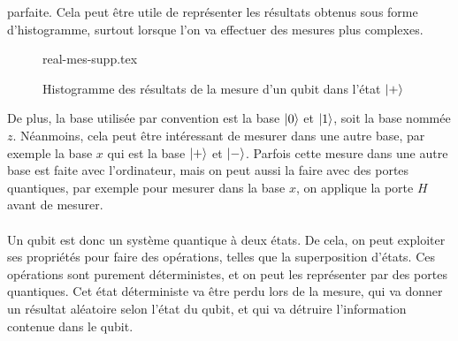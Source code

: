 parfaite.
Cela peut être utile de représenter les résultats obtenus sous forme d'histogramme, surtout lorsque l'on va
effectuer des mesures plus complexes.
\begin{figure}[H]
    \centering
    {real-mes-supp.tex}
    \caption[Histogramme des résultats de la mesure d'un qubit dans l'état $\ket{+}$]{Histogramme des résultats de la mesure d'un qubit dans l'état $\ket{+}$ \protect\footnotemark}
    \label{fig:measure}
\end{figure}
De plus, la base utilisée par convention est la base $\ket{0}$ et $\ket{1}$, soit la base nommée $z$.
Néanmoins, cela peut être intéressant de mesurer dans une autre base, par exemple la base $x$ qui est la base
$\ket{+}$ et $\ket{-}$.
Parfois cette mesure dans une autre base est faite avec l'ordinateur, mais on peut aussi la faire avec des
portes quantiques, par exemple pour mesurer dans la base $x$, on applique la porte $H$ avant de mesurer.\\ \\
Un qubit est donc un système quantique à deux états.
De cela, on peut exploiter ses propriétés pour faire des opérations, telles que la superposition d'états.
Ces opérations sont purement déterministes, et on peut les représenter par des portes quantiques.
Cet état déterministe va être perdu lors de la mesure, qui va donner un résultat aléatoire selon l'état du qubit,
et qui va détruire l'information contenue dans le qubit.
